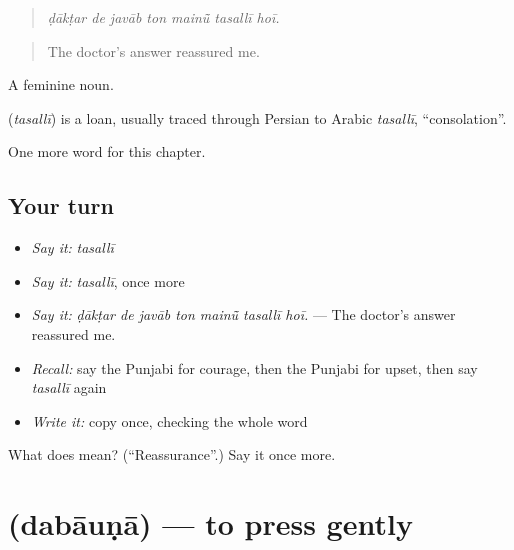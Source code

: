 \begin{quote}
      
\end{quote}

\begin{quote}
\emph{ḍākṭar de javāb ton mainū̃ tasallī hoī.}
\end{quote}

\begin{quote}
The doctor's answer reassured me.
\end{quote}

A feminine noun.

\begin{cousinweb}
\textbf{} (\emph{tasallī}) is a loan, usually traced through Persian to Arabic \emph{tasallī}, \textquotedblleft{}consolation\textquotedblright{}.
\end{cousinweb}

\begin{grammarlens}[title={What you've built}]
One more word for this chapter.
\end{grammarlens}

\subsection*{Your turn}
\begin{itemize}
\raggedright
  \item \emph{Say it:} \emph{tasallī}
  \item \emph{Say it:} \emph{tasallī}, once more
  \item \emph{Say it:} \emph{ḍākṭar de javāb ton mainū̃ tasallī hoī.} — The doctor's answer reassured me.
  \item \emph{Recall:} say the Punjabi for courage, then the Punjabi for upset, then say \emph{tasallī} again
  \item \emph{Write it:} copy \textbf{} once, checking the whole word
\end{itemize}

\begin{tcolorbox}[breakable,colback=teal!4,colframe=teal!35!black,title={Before you move on}]
What does  mean? (\textquotedblleft{}Reassurance\textquotedblright{}.) Say it once more.
\end{tcolorbox}
\section[\texorpdfstring{\pa{ਦਬਾਉਣਾ} (dabāuṇā)}{ਦਬਾਉਣਾ (dabāuṇā)}]{ (dabāuṇā) — to press gently}

